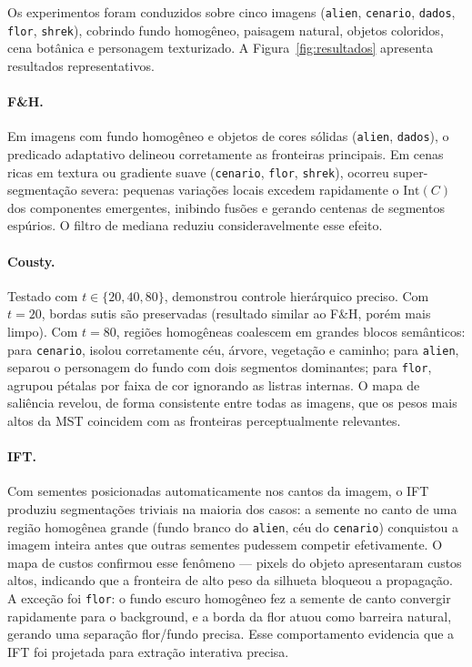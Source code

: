 \documentclass{sbc2023}
\begin{document}
Os experimentos foram conduzidos sobre cinco imagens (\texttt{alien},
\texttt{cenario}, \texttt{dados}, \texttt{flor}, \texttt{shrek}), cobrindo fundo
homogêneo, paisagem natural, objetos coloridos, cena botânica e personagem
texturizado. A Figura~\ref{fig:resultados} apresenta resultados representativos.

\paragraph{F\&H.} Em imagens com fundo homogêneo e objetos de cores sólidas
(\texttt{alien}, \texttt{dados}), o predicado adaptativo delineou corretamente as
fronteiras principais. Em cenas ricas em textura ou gradiente suave
(\texttt{cenario}, \texttt{flor}, \texttt{shrek}), ocorreu super-segmentação
severa: pequenas variações locais excedem rapidamente o $\mathrm{Int}(C)$ dos
componentes emergentes, inibindo fusões e gerando centenas de segmentos espúrios.
O filtro de mediana reduziu consideravelmente esse efeito.

\paragraph{Cousty.} Testado com $t \in \{20, 40, 80\}$, demonstrou controle
hierárquico preciso. Com $t{=}20$, bordas sutis são preservadas (resultado
similar ao F\&H, porém mais limpo). Com $t{=}80$, regiões homogêneas coalescem
em grandes blocos semânticos: para \texttt{cenario}, isolou corretamente céu,
árvore, vegetação e caminho; para \texttt{alien}, separou o personagem do fundo
com dois segmentos dominantes; para \texttt{flor}, agrupou pétalas por faixa de
cor ignorando as listras internas. O mapa de saliência revelou, de forma
consistente entre todas as imagens, que os pesos mais altos da MST coincidem com
as fronteiras perceptualmente relevantes.

\paragraph{IFT.} Com sementes posicionadas automaticamente nos cantos da imagem,
o IFT produziu segmentações triviais na maioria dos casos: a semente no canto de
uma região homogênea grande (fundo branco do \texttt{alien}, céu do
\texttt{cenario}) conquistou a imagem inteira antes que outras sementes pudessem
competir efetivamente. O mapa de custos confirmou esse fenômeno — pixels do
objeto apresentaram custos altos, indicando que a fronteira de alto peso da
silhueta bloqueou a propagação. A exceção foi \texttt{flor}: o fundo escuro
homogêneo fez a semente de canto convergir rapidamente para o background, e a
borda da flor atuou como barreira natural, gerando uma separação flor/fundo
precisa. Esse comportamento evidencia que a IFT foi projetada para extração interativa precisa.
\end{document}
